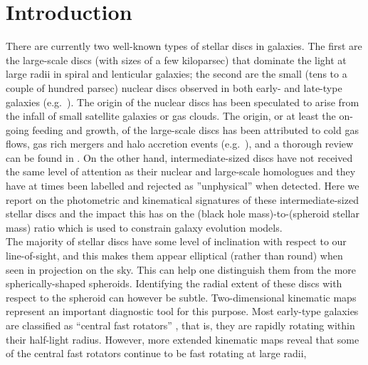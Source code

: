 \documentclass[useAMS,usenatbib,article]{mn2e}
\begin{document}
\section{Introduction}
\label{sec:int}
There are currently two well-known types of stellar discs in galaxies. 
The first are the large-scale discs (with sizes of a few kiloparsec) 
that dominate the light at large radii in spiral and lenticular galaxies; 
the second are the small (tens to a couple of hundred parsec) nuclear discs observed in both early- and late-type galaxies 
(e.g.~\citealt{scorzavandenbosch1998,rest2001,balcells2007,ledo2010}). 
The origin of the nuclear discs has been speculated to arise from the infall of small satellite galaxies or gas clouds.  
The origin, or at least the on-going feeding and growth, of the large-scale discs has been attributed to cold gas flows, 
gas rich mergers and halo accretion events 
(e.g.~\citealt{whiterees1978,whitefrenk1991,navarrobenz1991,khochfarsilk2006,dekel2009nat,ceverino2010,ceverino2012,conselice2012}), 
and a thorough review can be found in \citet{combes2014arX,combes2014pro}.
On the other hand, intermediate-sized discs have not received the same level of attention 
as their nuclear and large-scale homologues and 
they have at times been labelled and rejected as ''unphysical'' when detected. 
Here we report on the photometric and kinematical signatures of these intermediate-sized stellar discs 
and the impact this has on the (black hole mass)-to-(spheroid stellar mass) ratio %
which is used to constrain galaxy evolution models. \\
The majority of stellar discs have some level of inclination with respect to our line-of-sight, 
and this makes them appear elliptical (rather than round) when seen in projection on the sky. 
This can help one distinguish them from the more spherically-shaped spheroids. 
Identifying the radial extent of these discs with respect to the spheroid can however be subtle. 
Two-dimensional kinematic maps represent an important diagnostic tool for this purpose. 
Most early-type galaxies are classified as ``central fast rotators'' \citep{atlas3dIII-MNRAS}, 
that is, they are rapidly rotating within their half-light radius.  
However, more extended kinematic maps \citep{arnold2014} reveal that 
some of the central fast rotators continue to be fast rotating at large radii, 
\end{document}
